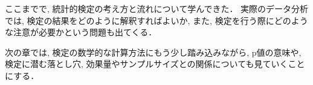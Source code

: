   ここまでで, 統計的検定の考え方と流れについて学んできた．
  実際のデータ分析では, 検定の結果をどのように解釈すればよいか,
  また, 検定を行う際にどのような注意が必要かという問題も出てくる．
  
  次の章では,
  検定の数学的な計算方法にもう少し踏み込みながら,
  p値の意味や, 検定に潜む落とし穴, 効果量やサンプルサイズとの関係についても見ていくことにする．
















